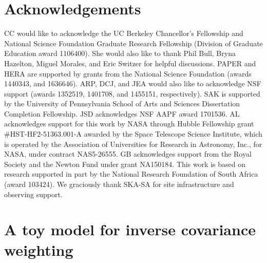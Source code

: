 \documentclass[preprint2,numberedappendix,tighten]{aastex6}  %
\begin{document}
\section{Acknowledgements}
CC would like to acknowledge the UC Berkeley Chancellor's Fellowship and National Science Foundation Graduate Research 
Fellowship (Division of Graduate Education award 1106400). She would also like to thank Phil Bull, Bryna Hazelton, Miguel Morales, and Eric Switzer for helpful discussions. PAPER and HERA 
are supported by grants from the National Science Foundation (awards 1440343, and 1636646). ARP, DCJ, and JEA would 
also like to acknowledge NSF support (awards 1352519, 1401708, and 1455151, respectively). SAK is supported by the University of Pennsylvania School of Arts and Sciences Dissertation Completion Fellowship. JSD acknowledges NSF AAPF
award 1701536. AL acknowledges support for this work by NASA through Hubble Fellowship grant \#HST-HF2-51363.001-A awarded by the Space Telescope Science Institute, which is operated by the Association of Universities for Research in Astronomy, Inc., for NASA, under contract NAS5-26555. GB acknowledges support from the Royal Society and the Newton Fund under grant NA150184. This work is based on research supported in part by the National Research Foundation of South Africa (award 103424). We graciously thank SKA-SA for site infrastructure and observing support.
\label{sec:Ack}



\appendix
\section{A toy model for inverse covariance weighting}
\label{sec:icw_appendix}

\end{document}
